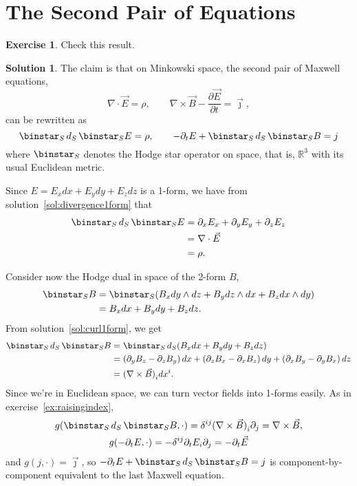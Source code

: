 \documentclass[11pt, a4paper]{report}
\theoremstyle{definition}
\newtheorem{exercise}{Exercise}[part]
\newtheorem{solution}{Solution}[part]
\newenvironment{ex}{\begin{exercise}}{\end{exercise}\pagebreak[1]}
\newenvironment{sol}{\begin{solution}}{\end{solution}\pagebreak[3]}
\newcommand*{\op}[1]{\ensuremath\mathop{}\mathopen{}#1}
\renewcommand*{\d}{\op{d}}
\renewcommand*{\star}{\op{\binstar}\mathord{}}
\begin{document}
\section{The Second Pair of Equations}\label{sec:secondpairmaxwellequations}

\begin{ex}

Check this result.

\end{ex}

\begin{sol}

The claim is that on Minkowski space, the second pair of Maxwell equations,
\[
    \nabla \cdot \vec{E} = \rho, \qquad
    \nabla \times \vec{B} - \frac{\partial \vec{E}}{\partial t} = \vec{\jmath},
\]
can be rewritten as
\[
    \star_S \d_S \star_S E = \rho, \qquad
    -\partial_t E + \star_S \d_S \star_S B = j
\]
where $\star_S$ denotes the Hodge star operator on space, that is, $\mathbb{R}^3$ with its usual Euclidean metric.

Since $E = E_x dx + E_y dy + E_z dz$ is a 1-form, we have from solution~\ref{sol:divergence1form} that
\begin{align*}
    \star_S \d_S \star_S E &= \partial_x E_x + \partial_y E_y + \partial_z E_z \\
                             &= \nabla \cdot \vec{E} \\
                             &= \rho.
\end{align*}

Consider now the Hodge dual in space of the 2-form $B$,
\begin{align*}
    \star_S B &= \star_S (B_x dy \wedge dz + B_y dz \wedge dx + B_z dx \wedge dy) \\
              &= B_x dx + B_y dy + B_z dz.
\end{align*}
From solution~\ref{sol:curl1form}, we get
\begin{align*}
    \star_S \d_S \star_S B &= \star_S \d_S (B_x dx + B_y dy + B_z dz) \\
        &= \left(\partial_y B_z - \partial_z B_y\right) dx
            + \left(\partial_z B_x - \partial_x B_z\right) dy
            + \left(\partial_x B_y - \partial_y B_x\right) dz \\
        &= {(\nabla \times \vec{B})}_i dx^i.
\end{align*}
Since we're in Euclidean space, we can turn vector fields into 1-forms easily. As in exercise~\ref{ex:raisingindex},
\begin{gather*}
    g(\star_S \d_S \star_S B, \cdot)
        = \delta^{ij} {(\nabla \times \vec{B})}_i \partial_j
        = \nabla \times \vec{B}, \\
    g(-\partial_t E, \cdot) = -\delta^{ij} \partial_t E_i \partial_j = -\partial_t \vec{E}
\end{gather*}
and $g(j, \cdot) = \vec{\jmath}$,
so $-\partial_t E + \star_S \d_S \star_S B = j$ is component-by-component equivalent to the last Maxwell equation.

\end{sol}
\end{document}
